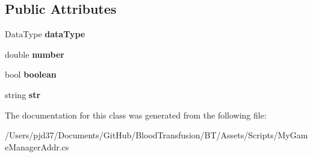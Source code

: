 \subsection*{Public Attributes}
\begin{DoxyCompactItemize}
\item 
Data\+Type {\bfseries data\+Type}\hypertarget{class_little_brain_1_1_g_m_addr_1_1_param_data_a525a8d05562e9de6f8a1592ccc50e305}{}\label{class_little_brain_1_1_g_m_addr_1_1_param_data_a525a8d05562e9de6f8a1592ccc50e305}

\item 
double {\bfseries number}\hypertarget{class_little_brain_1_1_g_m_addr_1_1_param_data_ab8f7ffdcf24da063c9c8840fcbca3ac7}{}\label{class_little_brain_1_1_g_m_addr_1_1_param_data_ab8f7ffdcf24da063c9c8840fcbca3ac7}

\item 
bool {\bfseries boolean}\hypertarget{class_little_brain_1_1_g_m_addr_1_1_param_data_a7fc3f061a5c735e18e4b6d6133ae7ad6}{}\label{class_little_brain_1_1_g_m_addr_1_1_param_data_a7fc3f061a5c735e18e4b6d6133ae7ad6}

\item 
string {\bfseries str}\hypertarget{class_little_brain_1_1_g_m_addr_1_1_param_data_a9bc8f163cf73398cdbbe53d0ca8a8611}{}\label{class_little_brain_1_1_g_m_addr_1_1_param_data_a9bc8f163cf73398cdbbe53d0ca8a8611}

\end{DoxyCompactItemize}


The documentation for this class was generated from the following file\+:\begin{DoxyCompactItemize}
\item 
/\+Users/pjd37/\+Documents/\+Git\+Hub/\+Blood\+Transfusion/\+B\+T/\+Assets/\+Scripts/My\+Game\+Manager\+Addr.\+cs\end{DoxyCompactItemize}
